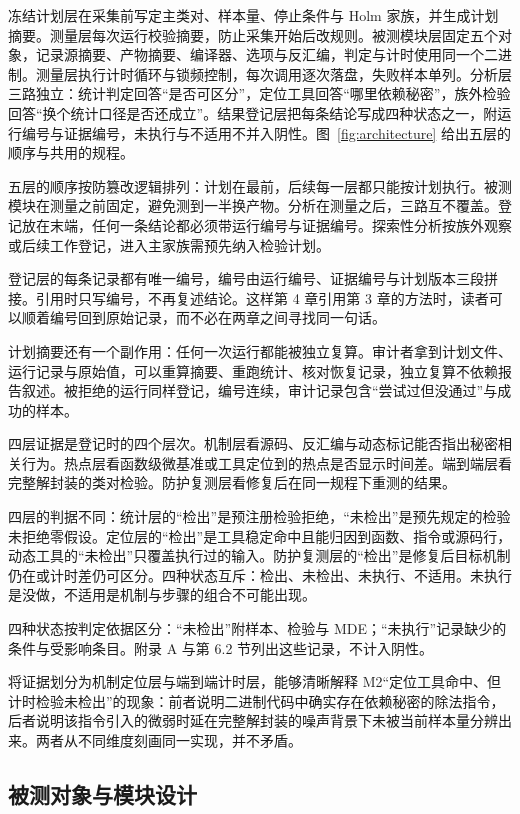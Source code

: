 冻结计划层在采集前写定主类对、样本量、停止条件与 Holm 家族，并生成计划摘要。测量层每次运行校验摘要，防止采集开始后改规则。被测模块层固定五个对象，记录源摘要、产物摘要、编译器、选项与反汇编，判定与计时使用同一个二进制。测量层执行计时循环与锁频控制，每次调用逐次落盘，失败样本单列。分析层三路独立：统计判定回答“是否可区分”，定位工具回答“哪里依赖秘密”，族外检验回答“换个统计口径是否还成立”。结果登记层把每条结论写成四种状态之一，附运行编号与证据编号，未执行与不适用不并入阴性。图~\ref{fig:architecture} 给出五层的顺序与共用的规程。

五层的顺序按防篡改逻辑排列：计划在最前，后续每一层都只能按计划执行。被测模块在测量之前固定，避免测到一半换产物。分析在测量之后，三路互不覆盖。登记放在末端，任何一条结论都必须带运行编号与证据编号。探索性分析按族外观察或后续工作登记，进入主家族需预先纳入检验计划。

登记层的每条记录都有唯一编号，编号由运行编号、证据编号与计划版本三段拼接。引用时只写编号，不再复述结论。这样第 4 章引用第 3 章的方法时，读者可以顺着编号回到原始记录，而不必在两章之间寻找同一句话。

计划摘要还有一个副作用：任何一次运行都能被独立复算。审计者拿到计划文件、运行记录与原始值，可以重算摘要、重跑统计、核对恢复记录，独立复算不依赖报告叙述。被拒绝的运行同样登记，编号连续，审计记录包含“尝试过但没通过”与成功的样本。

四层证据是登记时的四个层次。机制层看源码、反汇编与动态标记能否指出秘密相关行为。热点层看函数级微基准或工具定位到的热点是否显示时间差。端到端层看完整解封装的类对检验。防护复测层看修复后在同一规程下重测的结果。

四层的判据不同：统计层的“检出”是预注册检验拒绝，“未检出”是预先规定的检验未拒绝零假设。定位层的“检出”是工具稳定命中且能归因到函数、指令或源码行，动态工具的“未检出”只覆盖执行过的输入。防护复测层的“检出”是修复后目标机制仍在或计时差仍可区分。四种状态互斥：检出、未检出、未执行、不适用。未执行是没做，不适用是机制与步骤的组合不可能出现。

四种状态按判定依据区分：“未检出”附样本、检验与 MDE；“未执行”记录缺少的条件与受影响条目。附录 A 与第 6.2 节列出这些记录，不计入阴性。

将证据划分为机制定位层与端到端计时层，能够清晰解释 M2“定位工具命中、但计时检验未检出”的现象：前者说明二进制代码中确实存在依赖秘密的除法指令，后者说明该指令引入的微弱时延在完整解封装的噪声背景下未被当前样本量分辨出来。两者从不同维度刻画同一实现，并不矛盾。

\subsection{被测对象与模块设计}

